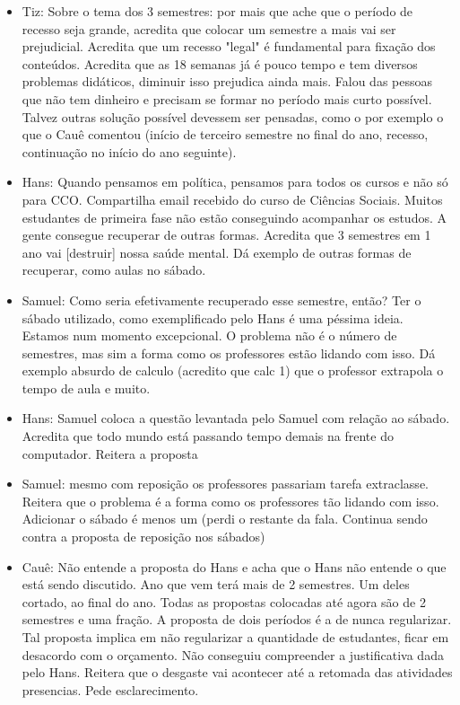 \documentclass{ata-calico}
\begin{document}
\begin{itemize}
    \item Tiz: Sobre o  tema dos 3 semestres: por mais que ache que o período de recesso seja grande, acredita que colocar um semestre a mais vai ser prejudicial. Acredita que um recesso "legal" é fundamental para fixação dos conteúdos. Acredita que as 18 semanas já é pouco tempo e tem diversos problemas didáticos, diminuir isso prejudica ainda mais. Falou das pessoas que não tem dinheiro e precisam se formar no período mais curto possível. Talvez outras solução possível devessem ser pensadas, como o por exemplo o que o Cauê comentou (início de terceiro semestre no final do ano, recesso, continuação no início do ano seguinte).
    
    \item Hans: Quando pensamos em política, pensamos para todos os cursos e não só para CCO. Compartilha email recebido do curso de Ciências Sociais. Muitos estudantes de primeira fase não estão conseguindo acompanhar os estudos. A gente consegue recuperar de outras formas. Acredita que 3 semestres em 1 ano vai [destruir] nossa saúde mental. Dá exemplo de outras formas de recuperar, como aulas no sábado.
    
    \item Samuel: Como seria efetivamente recuperado esse semestre, então? Ter o sábado utilizado, como exemplificado pelo Hans é uma péssima ideia. Estamos num momento excepcional. O problema não é o número de semestres, mas sim a forma como os professores estão lidando com isso. Dá exemplo absurdo de calculo (acredito que calc 1) que o professor extrapola o tempo de aula e muito.
    
    \item Hans: Samuel coloca a questão levantada pelo Samuel com relação ao sábado. Acredita que todo mundo está passando tempo demais na frente do computador. Reitera a proposta
    
    \item Samuel: mesmo com reposição os professores passariam tarefa extraclasse. Reitera que o problema é a forma como os professores tão lidando com isso. Adicionar o sábado é menos um (perdi o restante da fala. Continua sendo contra a proposta de reposição nos sábados)
    
    \item Cauê: Não entende a proposta do Hans e acha que o Hans não entende o que está sendo discutido. Ano que vem terá mais de 2 semestres. Um deles cortado, ao final do ano. Todas as propostas colocadas até agora são de 2 semestres e uma fração. A proposta de dois períodos é a de nunca regularizar. Tal proposta implica em não regularizar a quantidade de estudantes, ficar em desacordo com o orçamento. Não conseguiu compreender a justificativa dada pelo Hans. Reitera que o desgaste vai acontecer até a retomada das atividades presencias. Pede esclarecimento.
    

\end{itemize}
\end{document}
